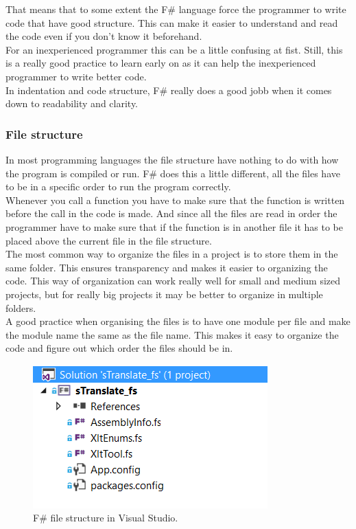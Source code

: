 \documentclass[12pt, a4paper]{article}
\begin{document}
That means that to some extent the F\# language force the programmer to write code that have good structure. This can make it easier to understand and read the code even if you don't know it beforehand.\\

For an inexperienced programmer this can be a little confusing at fist. Still, this is a really good practice to learn early on as it can help the inexperienced programmer to write better code.\\

In indentation and code structure, F\# really does a good jobb when it comes down to readability and clarity.

\newpage
\subsubsection{File structure}

In most programming languages the file structure have nothing to do with how the program is compiled or run. F\# does this a little different, all the files have to be in a specific order to run the program correctly.\\

Whenever you call a function you have to make sure that the function is written before the call in the code is made. And since all the files are read in order the programmer have to make sure that if the function is in another file it has to be placed above the current file in the file structure.\\

The most common way to organize the files in a project is to store them in the same folder. This ensures transparency and makes it easier to organizing the code. This way of organization can work really well for small and medium sized projects, but for really big projects it may be better to organize in multiple folders.\\

A good practice when organising the files is to have one module per file and make the module name the same as the file name. This makes it easy to organize the code and figure out which order the files should be in.



\begin{figure}[!h]
    \includegraphics{files}
    \caption{F\# file structure in Visual Studio.}
\end{figure}
\end{document}
